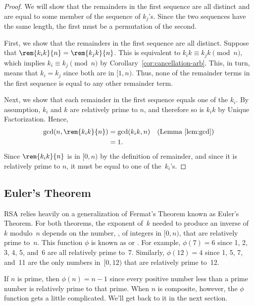 \begin{proof}
We will show that the remainders in the first sequence are all
distinct and are equal to some member of the sequence of $k_j$'s.
Since the two sequences have the same length, the first must be a
permutation of the second.

First, we show that the remainders in the first sequence are all
distinct.  Suppose that $\rem{k_i k}{n} = \rem{k_j k}{n}$.  This is
equivalent to $k_i k \equiv k_j k \pmod{n}$, which implies $k_i \equiv
k_j \pmod{n}$ by Corollary~\ref{cor:cancellation-arb}.  This, in turn,
means that $k_i = k_j$ since both are in $[1,n)$.  Thus, none
of the remainder terms in the first sequence is equal to any other
remainder term.

Next, we show that each remainder in the first sequence equals one of
the $k_i$.  By assumption, $k_i$ and $k$ are relatively prime to $n$,
and therefore so is $k_ik$ by Unique Factorization.  Hence,
\begin{align*}
\gcd(n, \rem{k_i k}{n}) & = \gcd(k_i k, n)
            & \text{(Lemma~\ref{lem:gcd})}\\
      & = 1.
\end{align*}
Since $\rem{k_i k}{n}$ is in $[0, n)$ by the definition of remainder,
  and since it is relatively prime to $n$, it must be equal to one of
  the~$k_i$'s.
\end{proof}

\subsection{Euler's Theorem}

RSA relies heavily on a generalization of Fermat's Theorem known as
Euler's Theorem.  For both theorems, the exponent of~$k$ needed to
produce an inverse of~$k$ modulo~$n$ depends on the number,
, of integers in $[0, n)$, that are relatively
    prime to~$n$.  This function $\phi$ is known as  or .
    For example, $\phi(7) = 6$ since 1, 2, 3, 4, 5, and~6 are all
    relatively prime to~7.  Similarly, $\phi(12) = 4$ since 1, 5, 7,
    and~11 are the only numbers in~$[0, 12)$ that are relatively prime
    to~12.

\iffalse \footnote{Recall that $\gcd(n, n) = n$ and so $n$ is never
    relatively prime to itself.}
\fi

If $n$ is prime, then $\phi(n) = n - 1$ since every positive number
less than a prime number is relatively prime to that prime.  When $n$
is composite, however, the $\phi$ function gets a little complicated.
We'll get back to it in the next section.

